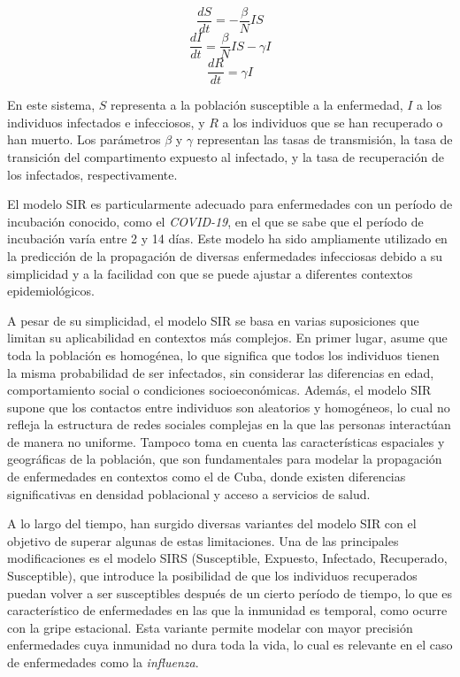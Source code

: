 \[
\frac{dS}{dt} = - \frac{\beta}{N}IS
\]
\[
\frac{dI}{dt} = \frac{\beta}{N}IS - \gamma I
\]
\[
\frac{dR}{dt} = \gamma I
\]

En este sistema, \(S\) representa a la población susceptible a la enfermedad, \(I\) a los individuos infectados e infecciosos, y \(R\) a los individuos que se han recuperado o han muerto. Los parámetros \(\beta\) y \(\gamma\) representan las tasas de transmisión, la tasa de transición del compartimento expuesto al infectado, y la tasa de recuperación de los infectados, respectivamente.

El modelo SIR es particularmente adecuado para enfermedades con un período de incubación conocido, como el \textit{COVID-19}, en el que se sabe que el período de incubación varía entre 2 y 14 días. Este modelo ha sido ampliamente utilizado en la predicción de la propagación de diversas enfermedades infecciosas debido a su simplicidad y a la facilidad con que se puede ajustar a diferentes contextos epidemiológicos.

A pesar de su simplicidad, el modelo SIR se basa en varias suposiciones que limitan su aplicabilidad en contextos más complejos. En primer lugar, asume que toda la población es homogénea, lo que significa que todos los individuos tienen la misma probabilidad de ser infectados, sin considerar las diferencias en edad, comportamiento social o condiciones socioeconómicas. Además, el modelo SIR supone que los contactos entre individuos son aleatorios y homogéneos, lo cual no refleja la estructura de redes sociales complejas en la que las personas interactúan de manera no uniforme. Tampoco toma en cuenta las características espaciales y geográficas de la población, que son fundamentales para modelar la propagación de enfermedades en contextos como el de Cuba, donde existen diferencias significativas en densidad poblacional y acceso a servicios de salud.

A lo largo del tiempo, han surgido diversas variantes del modelo SIR con el objetivo de superar algunas de estas limitaciones. Una de las principales modificaciones es el modelo SIRS (Susceptible, Expuesto, Infectado, Recuperado, Susceptible), que introduce la posibilidad de que los individuos recuperados puedan volver a ser susceptibles después de un cierto período de tiempo, lo que es característico de enfermedades en las que la inmunidad es temporal, como ocurre con la gripe estacional. Esta variante permite modelar con mayor precisión enfermedades cuya inmunidad no dura toda la vida, lo cual es relevante en el caso de enfermedades como la \textit{influenza}.


